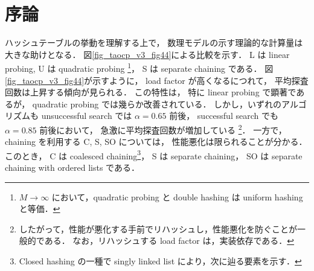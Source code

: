\chapter{序論}
\label{chap_Introduction}

ハッシュテーブルの挙動を理解する上で，
数理モデルの示す理論的な計算量は大きな助けとなる．
図\ref{fig_taocp_v3_fig44}に\cite{knuth1998}よる比較を示す．
L は linear probing,
U は quadratic probing \footnote{$M \rightarrow \infty$ において，quadratic probing と double hashing は uniform hashing と等価．}，
S は separate chaining である．
図\ref{fig_taocp_v3_fig44}が示すように，
load factor が高くなるにつれて，
平均探査回数は上昇する傾向が見られる．
この特性は，
特に linear probing で顕著であるが，
quadratic probing では幾らか改善されている．
しかし，いずれのアルゴリズムも
unsuccessful search では $\alpha = 0.65$ 前後，
successful search でも $\alpha = 0.85$ 前後において，
急激に平均探査回数が増加している
\footnote{
  したがって，性能が悪化する手前でリハッシュし，性能悪化を防ぐことが一般的である．
  なお，リハッシュする load factor は，実装依存である．
}．
一方で，chaining を利用する C, S, SO については，
性能悪化は限られることが分かる．
このとき，
C は coalesced chaining\footnote{Closed hashing の一種で singly linked list により，次に辿る要素を示す．}，
S は separate chaining，
SO は separate chaining with ordered lists である．





